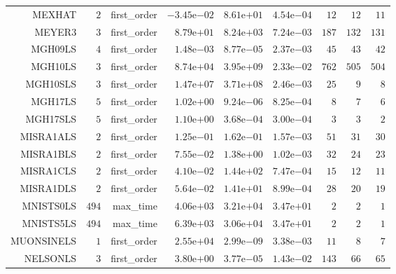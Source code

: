 \begin{longtable}{rrrrrrrrr}
MEXHAT & \(     2\) & first\_order & \(-3.45\)e\(-02\) & \( 8.61\)e\(+01\) & \( 4.54\)e\(-04\) & \(    12\) & \(    12\) & \(    11\) \\
MEYER3 & \(     3\) & first\_order & \( 8.79\)e\(+01\) & \( 8.24\)e\(+03\) & \( 7.24\)e\(-03\) & \(   187\) & \(   132\) & \(   131\) \\
MGH09LS & \(     4\) & first\_order & \( 1.48\)e\(-03\) & \( 8.77\)e\(-05\) & \( 2.37\)e\(-03\) & \(    45\) & \(    43\) & \(    42\) \\
MGH10LS & \(     3\) & first\_order & \( 8.74\)e\(+04\) & \( 3.95\)e\(+09\) & \( 2.33\)e\(-02\) & \(   762\) & \(   505\) & \(   504\) \\
MGH10SLS & \(     3\) & first\_order & \( 1.47\)e\(+07\) & \( 3.71\)e\(+08\) & \( 2.46\)e\(-03\) & \(    25\) & \(     9\) & \(     8\) \\
MGH17LS & \(     5\) & first\_order & \( 1.02\)e\(+00\) & \( 9.24\)e\(-06\) & \( 8.25\)e\(-04\) & \(     8\) & \(     7\) & \(     6\) \\
MGH17SLS & \(     5\) & first\_order & \( 1.10\)e\(+00\) & \( 3.68\)e\(-04\) & \( 3.00\)e\(-04\) & \(     3\) & \(     3\) & \(     2\) \\
MISRA1ALS & \(     2\) & first\_order & \( 1.25\)e\(-01\) & \( 1.62\)e\(-01\) & \( 1.57\)e\(-03\) & \(    51\) & \(    31\) & \(    30\) \\
MISRA1BLS & \(     2\) & first\_order & \( 7.55\)e\(-02\) & \( 1.38\)e\(+00\) & \( 1.02\)e\(-03\) & \(    32\) & \(    24\) & \(    23\) \\
MISRA1CLS & \(     2\) & first\_order & \( 4.10\)e\(-02\) & \( 1.44\)e\(+02\) & \( 7.47\)e\(-04\) & \(    15\) & \(    12\) & \(    11\) \\
MISRA1DLS & \(     2\) & first\_order & \( 5.64\)e\(-02\) & \( 1.41\)e\(+01\) & \( 8.99\)e\(-04\) & \(    28\) & \(    20\) & \(    19\) \\
MNISTS0LS & \(   494\) & max\_time & \( 4.06\)e\(+03\) & \( 3.21\)e\(+04\) & \( 3.47\)e\(+01\) & \(     2\) & \(     2\) & \(     1\) \\
MNISTS5LS & \(   494\) & max\_time & \( 6.39\)e\(+03\) & \( 3.06\)e\(+04\) & \( 3.47\)e\(+01\) & \(     2\) & \(     2\) & \(     1\) \\
MUONSINELS & \(     1\) & first\_order & \( 2.55\)e\(+04\) & \( 2.99\)e\(-09\) & \( 3.38\)e\(-03\) & \(    11\) & \(     8\) & \(     7\) \\
NELSONLS & \(     3\) & first\_order & \( 3.80\)e\(+00\) & \( 3.77\)e\(-05\) & \( 1.43\)e\(-02\) & \(   143\) & \(    66\) & \(    65\) \\

\end{longtable}
